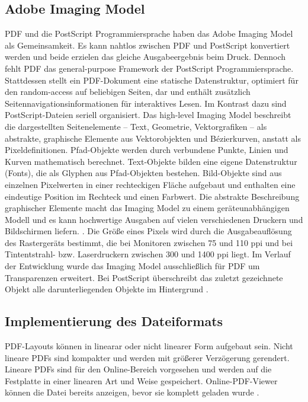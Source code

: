 \subsection{Adobe Imaging Model}
PDF und die PostScript Programmiersprache haben das Adobe Imaging Model als Gemeinsamkeit. Es kann nahtlos zwischen PDF und PostScript konvertiert werden und beide erzielen das gleiche Ausgabeergebnis beim Druck. Dennoch fehlt PDF das general-purpose Framework der PostScript Programmiersprache. Stattdessen stellt ein PDF-Dokument eine statische Datenstruktur, optimiert für den random-access auf beliebigen Seiten, dar und enthält zusätzlich Seitennavigationsinformationen für interaktives Lesen. Im Kontrast dazu sind PostScript-Dateien seriell organisiert. Das high-level Imaging Model beschreibt die dargestellten Seitenelemente – Text, Geometrie, Vektorgrafiken – als abstrakte, graphische Elemente aus Vektorobjekten und Bézierkurven, anstatt als Pixeldefinitionen. Pfad-Objekte werden durch verbundene Punkte, Linien und Kurven mathematisch berechnet. Text-Objekte bilden eine eigene Datenstruktur (Fonts), die als Glyphen aus Pfad-Objekten bestehen. Bild-Objekte sind aus einzelnen Pixelwerten in einer rechteckigen Fläche aufgebaut und enthalten eine eindeutige Position im Rechteck und einen Farbwert. Die abstrakte Beschreibung graphischer Elemente macht das Imaging Model zu einem geräteunabhängigen Modell und es kann hochwertige Ausgaben auf vielen verschiedenen Druckern und Bildschirmen liefern. \cite{adobe-postscript}. Die Größe eines Pixels wird durch die Ausgabeauflösung des Rastergeräts bestimmt, die bei Monitoren zwischen 75 und 110 \gls{ppi} und bei Tintentstrahl- bzw. Laserdruckern zwischen 300 und 1400 \gls{ppi} liegt. Im Verlauf der Entwicklung wurde das Imaging Model ausschließlich für PDF um Transparenzen erweitert. Bei PostScript überschreibt das zuletzt gezeichnete Objekt alle darunterliegenden Objekte im Hintergrund \cite{schneeberger}. 

\subsection{Implementierung des Dateiformats}
PDF-Layouts können in linearar oder nicht linearer Form aufgebaut sein. Nicht lineare PDFs sind kompakter und werden mit größerer Verzögerung gerendert. Lineare PDFs sind für den Online-Bereich vorgesehen und werden auf die Festplatte in einer linearen Art und Weise gespeichert. Online-PDF-Viewer können die Datei bereits anzeigen, bevor sie komplett geladen wurde \cite{fileformat}. 


